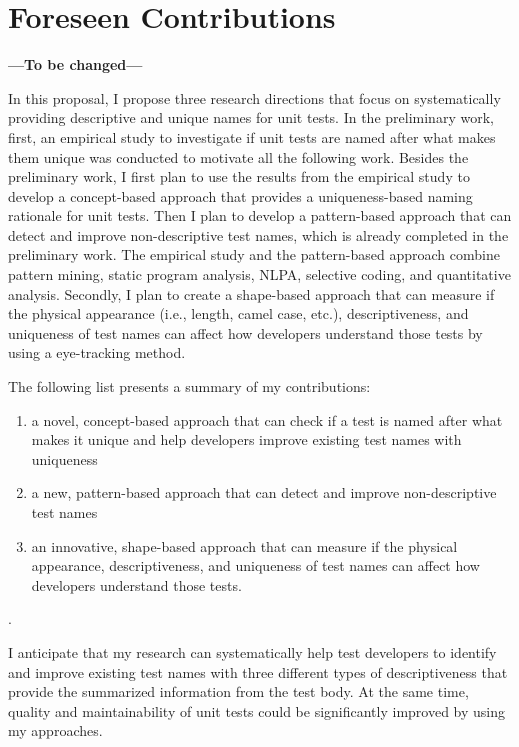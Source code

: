 \section{Foreseen Contributions}
\label{sec:contributions}

\textbf{---To be changed---}

In this proposal, I propose three research directions that focus on systematically providing descriptive and unique names for unit tests.
%
In the preliminary work, first, an empirical study to investigate if unit tests are named after what makes them unique was conducted to motivate all the following work.
%
Besides the preliminary work, I first plan to use the results from the empirical study to develop a concept-based approach that provides a uniqueness-based naming rationale for unit tests.
%
Then I plan to develop a pattern-based approach that can detect and improve non-descriptive test names, which is already completed in the preliminary work.
%
The empirical study and the pattern-based approach combine pattern mining, static program analysis, NLPA, selective coding, and quantitative analysis.
%
Secondly, I plan to create a shape-based approach that can measure if the physical appearance (i.e., length, camel case, etc.), descriptiveness, and uniqueness of test names can affect how developers understand those tests by using a eye-tracking method.

The following list presents a summary of my contributions:
\begin{enumerate}
    \item a novel, concept-based approach that can check if a test is named after what makes it unique and help developers improve existing test names with uniqueness
    \item a new, pattern-based approach that can detect and improve non-descriptive test names
    \item an innovative, shape-based approach that can measure if the physical appearance, descriptiveness, and uniqueness of test names can affect how developers understand those tests.
\end{enumerate}.

I anticipate that my research can systematically help test developers to identify and improve existing test names with three different types of descriptiveness that provide the summarized information from the test body.
%
At the same time, quality and maintainability of unit tests could be significantly improved by using my approaches.